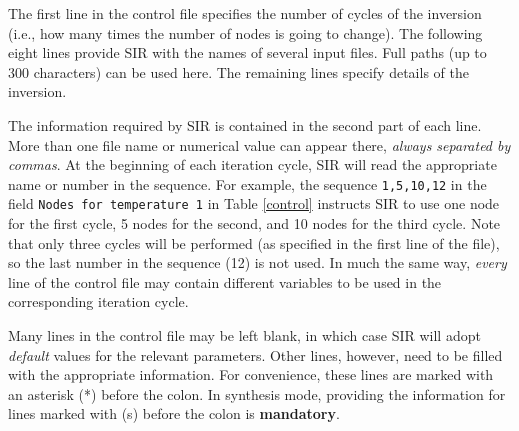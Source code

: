 \documentclass[11pt]{report}
\begin{document}
The first line in the control file specifies the number of cycles of
the inversion (i.e., how many times the number of nodes is going to
change). The following eight lines provide SIR with the names of 
several input files. Full paths (up to 300 characters) can be used
here. The remaining lines specify details of the inversion.

The information required by SIR is contained in the second part of each
line. More than one file name or numerical value can appear there, {\em
always separated by commas}. At the beginning of each iteration cycle,
SIR will read the appropriate name or number in the sequence. For
example, the sequence {\tt 1,5,10,12} in the field {\tt Nodes for
temperature 1} in Table \ref{control} instructs SIR to use one node for
the first cycle, 5 nodes for the second, and 10 nodes for the third
cycle. Note that only three cycles will be performed (as specified in
the first line of the file), so the last number in the sequence (12) is
not used. In much the same way, {\em every} line of the control file
may contain different variables to be used in the corresponding
iteration cycle.

Many lines in the control file may be left blank, in which case SIR
will adopt {\em default} values for the relevant parameters. Other lines,
however, need to be filled with the appropriate information. For
convenience, these lines are marked with an asterisk (*) before the
colon. In synthesis mode, providing the information for lines marked
with (s) before the colon is {\bf mandatory}.
\end{document}

